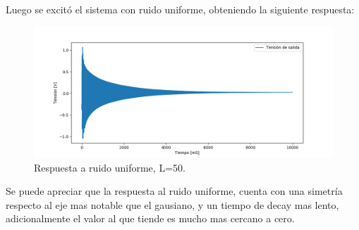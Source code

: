 Luego se excitó el sistema con ruido uniforme, obteniendo la siguiente respuesta:
\begin{figure}[H]
	\centering
	\includegraphics[width=\textwidth]{ImagenesEjercicio4/uniformResponse.PNG}
\caption{Respuesta a ruido uniforme, L=50.}
	\label{fig:uniforme}
\end{figure}
Se puede apreciar que la respuesta al ruido uniforme, cuenta con una simetría respecto al eje mas notable que el gausiano, y un tiempo de decay mas lento, adicionalmente el valor al que tiende es mucho mas cercano a cero.


